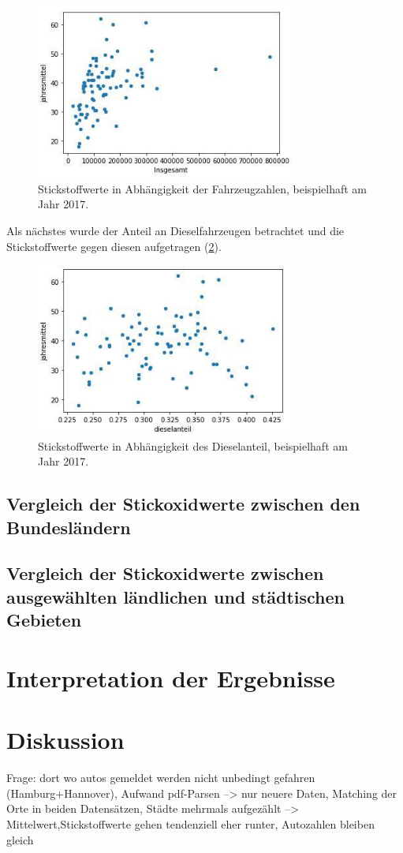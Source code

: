 \documentclass[11pt,a4paper,oneside,german]{article}
\begin{document}
\begin{figure}[h!]
	\centering
	\includegraphics[width=8.5cm]{NO2Insgesamt.jpg}
	\caption{Stickstoffwerte in Abhängigkeit der Fahrzeugzahlen, beispielhaft am Jahr 2017.}
	\label{fig:NO2Insgesamt}
\end{figure}

Als nächstes wurde der Anteil an Dieselfahrzeugen betrachtet und die Stickstoffwerte gegen diesen aufgetragen (\ref{fig:dieselanteil}).

\begin{figure}[h!]
	\centering
	\includegraphics[width=8.5cm]{dieselanteil.jpg}
	\caption{Stickstoffwerte in Abhängigkeit des Dieselanteil, beispielhaft am Jahr 2017.}
	\label{fig:dieselanteil}
\end{figure}

\subsection{Vergleich der Stickoxidwerte zwischen den Bundesländern}

\subsection{Vergleich der Stickoxidwerte zwischen ausgewählten ländlichen und städtischen Gebieten}

\section{Interpretation der Ergebnisse}

\section{Diskussion}

Frage: dort wo autos gemeldet werden nicht unbedingt gefahren (Hamburg+Hannover), Aufwand pdf-Parsen --> nur neuere Daten, Matching der Orte in beiden Datensätzen, Städte mehrmals aufgezählt --> Mittelwert,Stickstoffwerte gehen tendenziell eher runter, Autozahlen bleiben gleich
\end{document}
